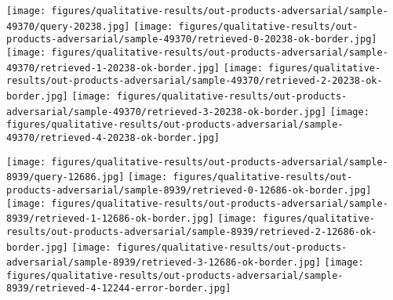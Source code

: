 \documentclass[10pt,journal,compsoc]{IEEEtran}
\begin{document}
\begin{figure*}[htbp]
\begin{center}
    \vspace{0.2cm}
    \texttt{[image: figures/qualitative-results/out-products-adversarial/sample-49370/query-20238.jpg]}
    \texttt{[image: figures/qualitative-results/out-products-adversarial/sample-49370/retrieved-0-20238-ok-border.jpg]}
    \texttt{[image: figures/qualitative-results/out-products-adversarial/sample-49370/retrieved-1-20238-ok-border.jpg]}
    \texttt{[image: figures/qualitative-results/out-products-adversarial/sample-49370/retrieved-2-20238-ok-border.jpg]}
    \texttt{[image: figures/qualitative-results/out-products-adversarial/sample-49370/retrieved-3-20238-ok-border.jpg]}
    \texttt{[image: figures/qualitative-results/out-products-adversarial/sample-49370/retrieved-4-20238-ok-border.jpg]}

    \vspace{0.2cm}
    \texttt{[image: figures/qualitative-results/out-products-adversarial/sample-8939/query-12686.jpg]}
    \texttt{[image: figures/qualitative-results/out-products-adversarial/sample-8939/retrieved-0-12686-ok-border.jpg]}
    \texttt{[image: figures/qualitative-results/out-products-adversarial/sample-8939/retrieved-1-12686-ok-border.jpg]}
    \texttt{[image: figures/qualitative-results/out-products-adversarial/sample-8939/retrieved-2-12686-ok-border.jpg]}
    \texttt{[image: figures/qualitative-results/out-products-adversarial/sample-8939/retrieved-3-12686-ok-border.jpg]}
    \texttt{[image: figures/qualitative-results/out-products-adversarial/sample-8939/retrieved-4-12244-error-border.jpg]}


\end{center}
\end{figure*}
\end{document}
